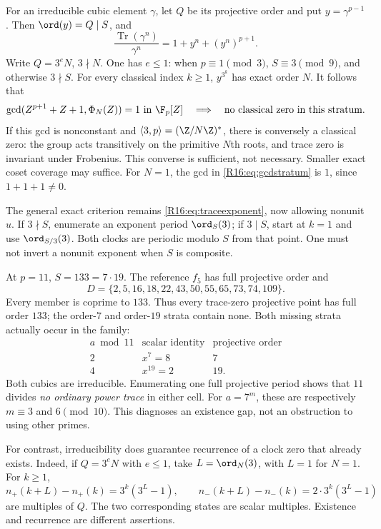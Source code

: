 \documentclass[11pt,a4paper]{article}
\theoremstyle{definition}\newtheorem{definition}[theorem]{Definition}
\theoremstyle{remark}\newtheorem{remark}[theorem]{Remark}
\DeclareMathOperator{\Tr}{Tr}\DeclareMathOperator{\tr}{tr}\DeclareMathOperator{\Nm}{N}
\begin{document}
For an irreducible cubic element $\gamma$, let $Q$ be its projective
order and put $y=\gamma^{p-1}$. Then $\ord(y)=Q\mid S$, and
\begin{equation}\label{R16:eq:tracenormone}
 \frac{\Tr(\gamma^n)}{\gamma^n}
 =1+y^n+(y^n)^{p+1}.
\end{equation}
Write $Q=3^eN$, $3\nmid N$. One has $e\le1$: when $p\equiv1\pmod3$,
$S\equiv3\pmod9$, and otherwise $3\nmid S$.
For every classical index $k\ge1$, $y^{3^k}$ has exact order $N$.
It follows that
\begin{equation}\label{R16:eq:gcdstratum}
 \gcd(Z^{p+1}+Z+1,\Phi_N(Z))=1\text{ in }\F_p[Z]
 \quad\Longrightarrow\quad\text{no classical zero in this stratum}.
\end{equation}
If this gcd is nonconstant and $\langle3,p\rangle=(\Z/N\Z)^*$,
there is conversely a classical zero: the group acts transitively on the
primitive $N$th roots, and trace zero is invariant under Frobenius.
This converse is sufficient, not necessary. Smaller exact coset coverage
may suffice. For $N=1$, the gcd in \eqref{R16:eq:gcdstratum} is $1$, since
$1+1+1\ne0$.

The general exact criterion remains \eqref{R16:eq:traceexponent}, now allowing
nonunit $u$. If $3\nmid S$, enumerate an exponent period
$\ord_S(3)$; if $3\mid S$, start at $k=1$ and use
$\ord_{S/3}(3)$. Both clocks are periodic modulo $S$ from that point.
One must not invert a nonunit exponent when $S$ is composite.

At $p=11$, $S=133=7\cdot19$. The reference $f_5$ has full projective
order and
\[
 D=\{2,5,16,18,22,43,50,55,65,73,74,109\}.
\]
Every member is coprime to $133$. Thus every trace-zero projective point
has full order $133$; the order-$7$ and order-$19$ strata contain none.
Both missing strata actually occur in the family:
\[
 \begin{array}{c|c|c}
 a\bmod11&\text{scalar identity}&\text{projective order}\\\hline
 2&x^7=8&7\\
 4&x^{19}=2&19.
 \end{array}
\]
Both cubics are irreducible. Enumerating one full projective period shows
that $11$ divides \emph{no ordinary power trace} in either cell.
For $a=7^m$, these are respectively $m\equiv3$ and $6\pmod{10}$.
This diagnoses an existence gap, not an obstruction to using other primes.

For contrast, irreducibility does guarantee recurrence of a clock zero
that already exists. Indeed, if $Q=3^eN$ with $e\le1$, take
$L=\ord_N(3)$, with $L=1$ for $N=1$. For $k\ge1$,
\[
 n_+(k+L)-n_+(k)=3^k(3^L-1),\qquad
 n_-(k+L)-n_-(k)=2\cdot3^k(3^L-1)
\]
are multiples of $Q$. The two corresponding states are scalar multiples.
Existence and recurrence are different assertions.
\end{document}

